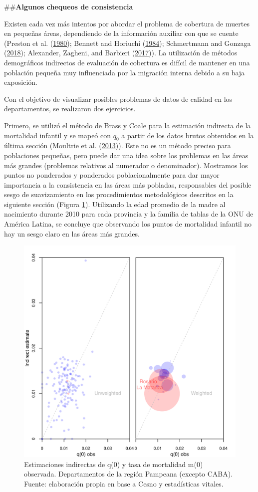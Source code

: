 \documentclass[12pt,]{article}
\begin{document}
\#\#\textbf{Algunos chequeos de consistencia}

Existen cada vez más intentos por abordar el problema de cobertura de
muertes en pequeñas áreas, dependiendo de la información auxiliar con
que se cuente (Preston et al.
(\protect\hyperlink{ref-Preston1980}{1980}); Bennett and Horiuchi
(\protect\hyperlink{ref-Bennett_Horiuchi_1984}{1984}); Schmertmann and
Gonzaga (\protect\hyperlink{ref-Schmertmann2018}{2018}); Alexander,
Zagheni, and Barbieri (\protect\hyperlink{ref-Alexander2017}{2017})). La
utilización de métodos demográficos indirectos de evaluación de
cobertura es difícil de mantener en una población pequeña muy
influenciada por la migración interna debido a su baja exposición.

Con el objetivo de visualizar posibles problemas de datos de calidad en
los departamentos, se realizaron dos ejercicios.

Primero, se utilizó el método de Brass y Coale para la estimación
indirecta de la mortalidad infantil y se mapeó con \(q_0\) a partir de
los datos brutos obtenidos en la última sección (Moultrie et al.
(\protect\hyperlink{ref-Moultrie}{2013})). Este no es un método preciso
para poblaciones pequeñas, pero puede dar una idea sobre los problemas
en las áreas más grandes (problemas relativos al numerador o
denominador). Mostramos los puntos no ponderados y ponderados
poblacionalmente para dar mayor importancia a la consistencia en las
áreas más pobladas, responsables del posible sesgo de suavizamiento en
los procedimientos metodológicos descritos en la siguiente sección
(Figura \ref{fig:PF}). Utilizando la edad promedio de la madre al
nacimiento durante 2010 para cada provincia y la familia de tablas de la
ONU de América Latina, se concluye que observando los puntos de
mortalidad infantil no hay un sesgo claro en las áreas más grandes.

\begin{figure}

{\centering \includegraphics[width=0.7\linewidth]{plots/ChekPF} 

}

\caption{Estimaciones indirectas de q(0) y tasa de mortalidad m(0) observada. Departamentos de la región Pampeana (excepto CABA). Fuente: elaboración propia en base a Cesno y estadísticas vitales.}\label{fig:PF}
\end{figure}
\end{document}
